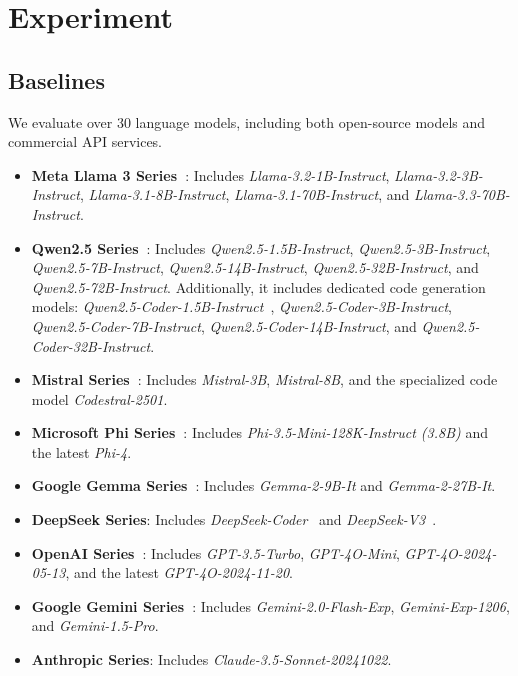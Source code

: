 \section{Experiment}

\subsection{Baselines}
We evaluate over 30 language models, including both open-source models and commercial API services.

\begin{itemize}
    \item \textbf{Meta Llama 3 Series~\cite{touvron2023llama}}: Includes \textit{Llama-3.2-1B-Instruct}, \textit{Llama-3.2-3B-Instruct}, \textit{Llama-3.1-8B-Instruct}, \textit{Llama-3.1-70B-Instruct}, and \textit{Llama-3.3-70B-Instruct}.
    \item \textbf{Qwen2.5 Series~\cite{yang2024qwen2}}: Includes \textit{Qwen2.5-1.5B-Instruct}, \textit{Qwen2.5-3B-Instruct}, \textit{Qwen2.5-7B-Instruct}, \textit{Qwen2.5-14B-Instruct}, \textit{Qwen2.5-32B-Instruct}, and \textit{Qwen2.5-72B-Instruct}. Additionally, it includes dedicated code generation models: \textit{Qwen2.5-Coder-1.5B-Instruct}~\cite{hui2024qwen25codertechnicalreport}, \textit{Qwen2.5-Coder-3B-Instruct}, \textit{Qwen2.5-Coder-7B-Instruct}, \textit{Qwen2.5-Coder-14B-Instruct}, and \textit{Qwen2.5-Coder-32B-Instruct}.
    \item \textbf{Mistral Series~\cite{Jiang2023Mistral7}}: Includes \textit{Mistral-3B}, \textit{Mistral-8B}, and the specialized code model \textit{Codestral-2501}.
    \item \textbf{Microsoft Phi Series~\cite{abdin2024phi4technicalreport}}: Includes \textit{Phi-3.5-Mini-128K-Instruct (3.8B)} and the latest \textit{Phi-4}.
    \item \textbf{Google Gemma Series~\cite{gemmateam2024gemmaopenmodelsbased}}: Includes \textit{Gemma-2-9B-It} and \textit{Gemma-2-27B-It}.
    \item \textbf{DeepSeek Series}: Includes \textit{DeepSeek-Coder}~\cite{guo2024deepseek} and \textit{DeepSeek-V3}~\cite{deepseekai2024deepseekv3technicalreport}.
    \item \textbf{OpenAI Series~\cite{achiam2023gpt4}}: Includes \textit{GPT-3.5-Turbo}, \textit{GPT-4O-Mini}, \textit{GPT-4O-2024-05-13}, and the latest \textit{GPT-4O-2024-11-20}.
    \item \textbf{Google Gemini Series~\cite{geminiteam2024geminifamilyhighlycapable}}: Includes \textit{Gemini-2.0-Flash-Exp}, \textit{Gemini-Exp-1206}, and \textit{Gemini-1.5-Pro}.
    \item \textbf{Anthropic Series}: Includes \textit{Claude-3.5-Sonnet-20241022}.
\end{itemize}

